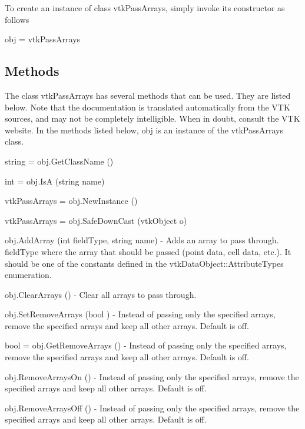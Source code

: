 To create an instance of class vtk\-Pass\-Arrays, simply invoke its constructor as follows \begin{DoxyVerb}  obj = vtkPassArrays
\end{DoxyVerb}
 \hypertarget{vtkwidgets_vtkxyplotwidget_Methods}{}\subsection{Methods}\label{vtkwidgets_vtkxyplotwidget_Methods}
The class vtk\-Pass\-Arrays has several methods that can be used. They are listed below. Note that the documentation is translated automatically from the V\-T\-K sources, and may not be completely intelligible. When in doubt, consult the V\-T\-K website. In the methods listed below, {\ttfamily obj} is an instance of the vtk\-Pass\-Arrays class. 
\begin{DoxyItemize}
\item {\ttfamily string = obj.\-Get\-Class\-Name ()}  
\item {\ttfamily int = obj.\-Is\-A (string name)}  
\item {\ttfamily vtk\-Pass\-Arrays = obj.\-New\-Instance ()}  
\item {\ttfamily vtk\-Pass\-Arrays = obj.\-Safe\-Down\-Cast (vtk\-Object o)}  
\item {\ttfamily obj.\-Add\-Array (int field\-Type, string name)} -\/ Adds an array to pass through. field\-Type where the array that should be passed (point data, cell data, etc.). It should be one of the constants defined in the vtk\-Data\-Object\-::\-Attribute\-Types enumeration.  
\item {\ttfamily obj.\-Clear\-Arrays ()} -\/ Clear all arrays to pass through.  
\item {\ttfamily obj.\-Set\-Remove\-Arrays (bool )} -\/ Instead of passing only the specified arrays, remove the specified arrays and keep all other arrays. Default is off.  
\item {\ttfamily bool = obj.\-Get\-Remove\-Arrays ()} -\/ Instead of passing only the specified arrays, remove the specified arrays and keep all other arrays. Default is off.  
\item {\ttfamily obj.\-Remove\-Arrays\-On ()} -\/ Instead of passing only the specified arrays, remove the specified arrays and keep all other arrays. Default is off.  
\item {\ttfamily obj.\-Remove\-Arrays\-Off ()} -\/ Instead of passing only the specified arrays, remove the specified arrays and keep all other arrays. Default is off.  

\end{DoxyItemize}
